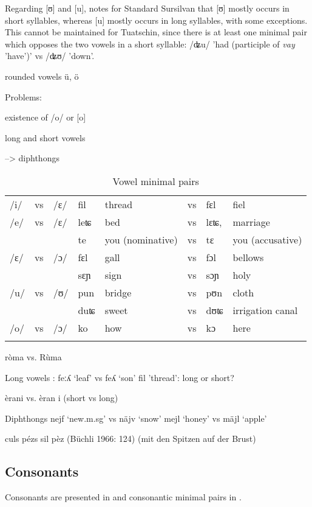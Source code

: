 Regarding [ʊ] and [u], \citet[130]{Liver2010} notes for Standard Sursilvan that [ʊ] mostly occurs in short syllables, whereas [u] mostly occurs in long syllables, with some exceptions. This cannot be maintained for Tuatschin, since there is at least one minimal pair which opposes the two vowels in a short syllable: /ʥu/ 'had (participle of \textit{vay} 'have')' vs /ʥʊ/ 'down'.

rounded vowels ü, ö

Problems:

existence of /o/ or [o]

long and short vowels

--> diphthongs



\begin{table}
\caption{Vowel minimal pairs}
\label{vmp}
 \begin{tabular}{llllllll}
 \midrule
/i/&vs&/ɛ/&fil&thread&vs&fɛl&fiel\\
/e/&vs&/ɛ/&leʨ&bed&vs&lɛʨ, &marriage\\
&&&te&you (nominative)& vs &tɛ & you (accusative)\\
/ɛ/&vs&/ɔ/&fɛl &gall &vs & fɔl &bellows\\
&&&sɛɲ&sign & vs & sɔɲ & holy\\
/u/&vs&/ʊ/&pun &bridge&vs&pʊn &cloth\\
&&& duʨ & sweet & vs & dʊʨ & irrigation canal\\
/o/&vs&/ɔ/&ko&how&vs&kɔ&here\\
 \lspbottomrule
 \end{tabular}
\end{table}

ròma vs. Rùma

Long vowels :
feːʎ ‘leaf’ vs feʎ ‘son’
fil 'thread': long or short?

èrani vs. èran i (short vs long)




Diphthongs
nejf ‘new.m.sg’ vs näjv ‘snow’
mejl ‘honey’ vs mäjl ‘apple’

culs pézs sil pèz (Büchli 1966: 124) (mit den Spitzen auf der Brust)


\subsection{Consonants}
Consonants are presented in  and consonantic minimal pairs in .


